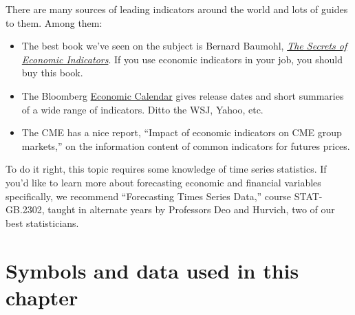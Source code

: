 There are many sources of leading indicators around the world
and lots of guides to them.
Among them:
%
\begin{itemize}

\item The best book we've seen on the subject is
Bernard Baumohl,
\href{http://www.amazon.com/The-Secrets-Economic-Indicators-Opportunities/dp/0132932075/}
{\it The Secrets of Economic Indicators\/}.
If you use economic indicators in your job, you should buy this book.

\item The Bloomberg
\href{http://www.bloomberg.com/markets/ecalendar/index.html}
{Economic Calendar}
gives release dates and short summaries of a wide range of indicators.
Ditto the WSJ, Yahoo, etc.


\item The CME has a nice report,
``Impact of economic indicators on CME group markets,''
on the information content of common indicators for futures prices.


\end{itemize}
%
To do it right, this topic requires some knowledge of time series statistics.
If you'd like to learn more about forecasting economic and
financial variables specifically,
we recommend ``Forecasting Times Series Data,'' course STAT-GB.2302,
taught in alternate years by Professors Deo and Hurvich, two of our best statisticians.

\section*{Symbols and data used in this chapter}


